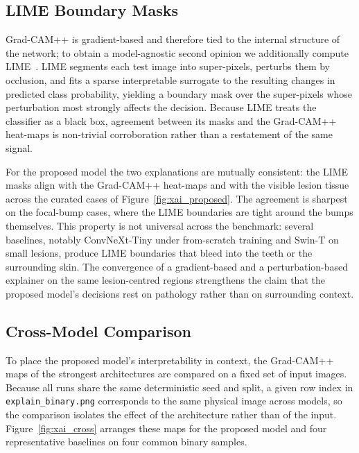 \subsection{LIME Boundary Masks}\label{subsec:lime}

Grad-CAM++ is gradient-based and therefore tied to the internal structure of
the network; to obtain a model-agnostic second opinion we additionally compute
LIME~\cite{ribeiro2016lime}. LIME segments each test image into super-pixels,
perturbs them by occlusion, and fits a sparse interpretable surrogate to the
resulting changes in predicted class probability, yielding a boundary mask over
the super-pixels whose perturbation most strongly affects the decision. Because
LIME treats the classifier as a black box, agreement between its masks and the
Grad-CAM++ heat-maps is non-trivial corroboration rather than a restatement of
the same signal.

For the proposed model the two explanations are mutually consistent: the LIME
masks align with the Grad-CAM++ heat-maps and with the visible lesion tissue
across the curated cases of Figure~\ref{fig:xai_proposed}. The agreement is
sharpest on the focal-bump cases, where the LIME boundaries are tight around
the bumps themselves. This property is not universal across the benchmark:
several baselines, notably ConvNeXt-Tiny under from-scratch training and Swin-T
on small lesions, produce LIME boundaries that bleed into the teeth or the
surrounding skin. The convergence of a gradient-based and a perturbation-based
explainer on the same lesion-centred regions strengthens the claim that the
proposed model's decisions rest on pathology rather than on surrounding context.

\subsection{Cross-Model Comparison}\label{subsec:xai_compare}

To place the proposed model's interpretability in context, the Grad-CAM++ maps
of the strongest architectures are compared on a fixed set of input images.
Because all runs share the same deterministic seed and split, a given row index
in \texttt{explain\_binary.png} corresponds to the same physical image across
models, so the comparison isolates the effect of the architecture rather than
of the input. Figure~\ref{fig:xai_cross} arranges these maps for the proposed
model and four representative baselines on four common binary samples.

